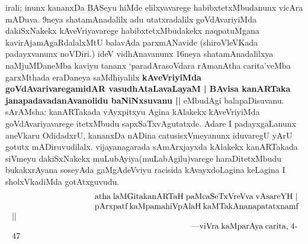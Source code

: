 \documentclass[11pt,a4size]{article}
\begin{document}
irali; inunx kananxDa BASeyu hiMde elilxyavarege habibxtetxMbudanunx
vicAra mADuva. 9neya shatamAnadalilx adu utatxradalilx goVdAvariyiMda
dakiSxNakekx kAveVriyavarege habibxtetxMbudakekx naqpatuMgana
kavirAjamAgaRdalalxMtU balavAda parxmANavide (shiroVleVKada
padayxvanunx noVDiri.) ideV vidhAnavanunx 16neya shatamAnadalilxya
naMjuMDaneMba kaviyu tananx `paradArasoVdara rAmanAtha carita'veMba
garxMthada eraDaneya saMdhiyalilx \textbf{kAveVriyiMda
  goVdAvarivaregamidAR vasudhAtaLavaLayaM | BAvisa kanARTaka
  janapadavadanAvanolidu baNiNxsuvanu ||} eMbudAgi
balapaDisuvanu. sArAMsha: kanARTakada vAyxpitxyu Agina kAlakekx
kAveVriyiMda goVdAvariyavarege itetxMbudu sapxSaTxvAgutatxde. Adare I
padayxgaLanunx aneVkaru OdidadxrU, kananxDa nADina catusisxVmeyanunx
iduvaregU yArU gotutx mADiruvudilalx. vijayanagarada sAmArxjayxda
kAlakekx kanARTakada siVmeyu dakiSxNakekx muLubAyiya(muLabAgilu)varege
haraDitetxMbudu bukakxrAyana soseyAda gaMgAdeVviyu racisida
kAvayxdoLagina keLagina I sholxVkadiMda gotAtxguvudu.
$$
\vbox{\parskip=0pt\parindent=0pt \everypar{\hskip10em} \obeylines
atha laMGitakanARTaH paMcaSeTxVreVva vAsareYH |
pArxpatf kaMpamahiVpAlaH kaMTakAnanapatatxnamf ||
\hspace{4cm} ---viVra kaMparAya carita, 4-47}
$$
\end{document}
